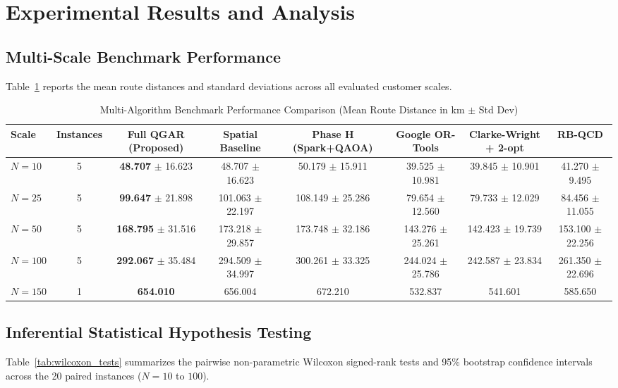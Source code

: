 \documentclass[journal,10pt]{IEEEtran}
\begin{document}
\section{Experimental Results and Analysis}

\subsection{Multi-Scale Benchmark Performance}
Table~\ref{tab:benchmark_results} reports the mean route distances and standard deviations across all evaluated customer scales.

\begin{table}[t]
\caption{Multi-Algorithm Benchmark Performance Comparison (Mean Route Distance in km $\pm$ Std Dev)}
\label{tab:benchmark_results}
\centering
\begin{tabular}{lccccccc}
\toprule
\textbf{Scale} & \textbf{Instances} & \textbf{Full QGAR (Proposed)} & \textbf{Spatial Baseline} & \textbf{Phase H (Spark+QAOA)} & \textbf{Google OR-Tools} & \textbf{Clarke-Wright + 2-opt} & \textbf{RB-QCD} \\
\midrule
$N=10$  & 5 & \textbf{48.707} $\pm$ 16.623 & 48.707 $\pm$ 16.623 & 50.179 $\pm$ 15.911 & 39.525 $\pm$ 10.981 & 39.845 $\pm$ 10.901 & 41.270 $\pm$ 9.495 \\
$N=25$  & 5 & \textbf{99.647} $\pm$ 21.898 & 101.063 $\pm$ 22.197 & 108.149 $\pm$ 25.286 & 79.654 $\pm$ 12.560 & 79.733 $\pm$ 12.029 & 84.456 $\pm$ 11.055 \\
$N=50$  & 5 & \textbf{168.795} $\pm$ 31.516 & 173.218 $\pm$ 29.857 & 173.748 $\pm$ 32.186 & 143.276 $\pm$ 25.261 & 142.423 $\pm$ 19.739 & 153.100 $\pm$ 22.256 \\
$N=100$ & 5 & \textbf{292.067} $\pm$ 35.484 & 294.509 $\pm$ 34.997 & 300.261 $\pm$ 33.325 & 244.024 $\pm$ 25.786 & 242.587 $\pm$ 23.834 & 261.350 $\pm$ 22.696 \\
$N=150$ & 1 & \textbf{654.010} & 656.004 & 672.210 & 532.837 & 541.601 & 585.650 \\
\bottomrule
\end{tabular}
\end{table}

\subsection{Inferential Statistical Hypothesis Testing}
Table~\ref{tab:wilcoxon_tests} summarizes the pairwise non-parametric Wilcoxon signed-rank tests and 95\% bootstrap confidence intervals across the 20 paired instances ($N=10$ to $100$).
\end{document}
